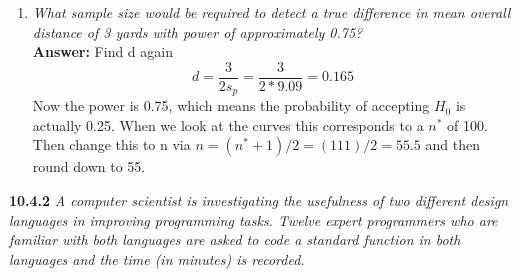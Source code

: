 \documentclass[11pt]{article}
\begin{document}
\begin{enumerate}
\item \emph{What sample size would be required to detect a true difference in mean overall distance of 3 yards with power of approximately 0.75?}
\\\textbf{Answer:} Find d again
\begin{equation}
d = \frac{3}{2s_p} = \frac{3}{2*9.09} = 0.165
\end{equation}
Now the power is 0.75, which means the probability of accepting $H_0$ is actually 0.25. When we look at the curves this corresponds to a $n^*$ of 100. Then change this to n via $n = (n^* +1)/2 = (111)/2= 55.5$ and then round down to 55.
\end{enumerate}



\noindent \textbf{10.4.2} \emph{A computer scientist is investigating the usefulness of two different design languages in improving programming tasks. Twelve expert programmers who are familiar with both languages are asked to code a standard function in both languages and the time (in minutes) is recorded.}
\end{document}
